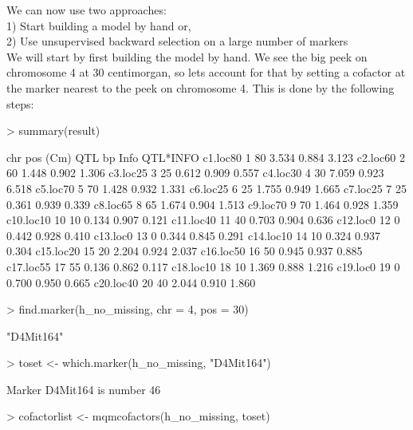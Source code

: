 \documentclass[11pt]{article}
\begin{document}
We can now use two approaches:\\
1) Start building a model by hand or,\\
2) Use unsupervised backward selection on a large number of markers\\
We will start by first building the model by hand. We see the big peek on chromosome 4 at 30 centimorgan, so lets account for that by setting a cofactor at the marker nearest to the peek on chromosome 4. This is done by the following steps:
\\
\begin{Schunk}
\begin{Sinput}
> summary(result)
\end{Sinput}
\begin{Soutput}
          chr pos (Cm) QTL bp  Info QTL*INFO
c1.loc80    1       80  3.534 0.884    3.123
c2.loc60    2       60  1.448 0.902    1.306
c3.loc25    3       25  0.612 0.909    0.557
c4.loc30    4       30  7.059 0.923    6.518
c5.loc70    5       70  1.428 0.932    1.331
c6.loc25    6       25  1.755 0.949    1.665
c7.loc25    7       25  0.361 0.939    0.339
c8.loc65    8       65  1.674 0.904    1.513
c9.loc70    9       70  1.464 0.928    1.359
c10.loc10  10       10  0.134 0.907    0.121
c11.loc40  11       40  0.703 0.904    0.636
c12.loc0   12        0  0.442 0.928    0.410
c13.loc0   13        0  0.344 0.845    0.291
c14.loc10  14       10  0.324 0.937    0.304
c15.loc20  15       20  2.204 0.924    2.037
c16.loc50  16       50  0.945 0.937    0.885
c17.loc55  17       55  0.136 0.862    0.117
c18.loc10  18       10  1.369 0.888    1.216
c19.loc0   19        0  0.700 0.950    0.665
c20.loc40  20       40  2.044 0.910    1.860
\end{Soutput}
\begin{Sinput}
> find.marker(h_no_missing, chr = 4, pos = 30)
\end{Sinput}
\begin{Soutput}
[1] "D4Mit164"
\end{Soutput}
\begin{Sinput}
> toset <- which.marker(h_no_missing, "D4Mit164")
\end{Sinput}
\begin{Soutput}
Marker D4Mit164 is number 46 
\end{Soutput}
\begin{Sinput}
> cofactorlist <- mqmcofactors(h_no_missing, toset)
\end{Sinput}
\end{Schunk}
\end{document}
